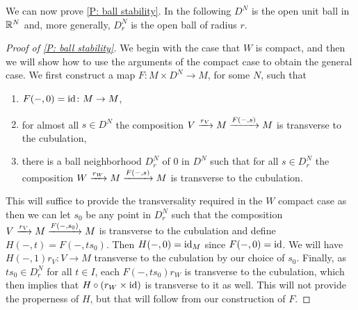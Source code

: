 We can now prove \cref{P: ball stability}.
In the following $D^N$ is the open unit ball in $\mathbb{R}^N$ and, more generally, $D^N_r$ is the open ball of radius $r$.

\begin{proof}[Proof of \cref{P: ball stability}]
	We begin with the case that $W$ is compact, and then we will show how to use the arguments of the compact case to obtain the general case.
	We first construct a map $F \colon M \times D^N \to M$, for some $N$, such that

	\begin{enumerate}
		\item $F(-,0) = \mathrm{id} \colon M \to M$,
		\item for almost all $s \in D^N$ the composition $V \xrightarrow{r_V} M \xrightarrow{F(-,s)}M$ is transverse to the cubulation,
		\item there is a ball neighborhood $D_r^N$ of $0$ in $D^N$ such that for all $s \in D_r^N$ the composition $W \xrightarrow{r_W} M \xrightarrow{F(-,s)}M$ is transverse to the cubulation.
	\end{enumerate}

	This will suffice to provide the transversality required in the $W$ compact case as then we can let $s_0$ be any point in $D_r^N$ such that the composition $V \xrightarrow{r_V} M \xrightarrow{F(-,s_0)}M$ is transverse to the cubulation and define $H(-,t) = F(-,ts_0)$.
	Then $H(-,0) = \mathrm{id}_M$ since $F(-,0) = \mathrm{id}$.
	We will have $H(-,1) r_V \colon V \to M$ transverse to the cubulation by our choice of $s_0$.
	Finally, as $ts_0 \in D_r^N$ for all $t \in I$, each $F(-,ts_0)r_W$ is transverse to the cubulation, which then implies that $H \circ (r_{W} \times \mathrm{id})$ is transverse to it as well.
	This will not provide the properness of $H$, but that will follow from our construction of $F$.
	\begin{comment}Furthermore, for $V$ compact any map and homotopy are proper, and this homotopy is universal as it can be decomposed into $r_V \colon V \times I \to M \times I$ and the homotopy $M \times I \to M$ taking $(z,t)$ to $F(z,ts_0)$.
	\end{comment}


\end{proof}
